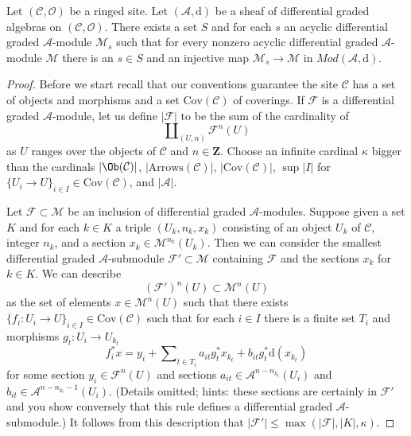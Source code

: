 \begin{lemma}
\label{lemma-small-acyclics}
Let $(\mathcal{C}, \mathcal{O})$ be a ringed site.
Let $(\mathcal{A}, \text{d})$ be a sheaf of differential graded algebras
on $(\mathcal{C}, \mathcal{O})$. There exists a set $S$ and for each $s$
an acyclic differential graded $\mathcal{A}$-module $\mathcal{M}_s$ such
that for every nonzero acyclic differential graded $\mathcal{A}$-module
$\mathcal{M}$ there is an $s \in S$ and an injective map
$\mathcal{M}_s \to \mathcal{M}$ in $\textit{Mod}(\mathcal{A}, \text{d})$.
\end{lemma}

\begin{proof}
Before we start recall that our conventions guarantee the site $\mathcal{C}$
has a set of objects and morphisms and a set $\text{Cov}(\mathcal{C})$
of coverings.
If $\mathcal{F}$
is a differential graded $\mathcal{A}$-module, let us define $|\mathcal{F}|$
to be the sum of the cardinality of
$$
\coprod\nolimits_{(U, n)} \mathcal{F}^n(U)
$$
as $U$ ranges over the objects of $\mathcal{C}$ and $n \in \mathbf{Z}$.
Choose an infinite cardinal $\kappa$ bigger than
the cardinals $|\Ob(\mathcal{C})|$, $|\text{Arrows}(\mathcal{C})|$,
$|\text{Cov}(\mathcal{C})|$, $\sup |I|$ for
$\{U_i \to U\}_{i \in I} \in \text{Cov}(\mathcal{C})$,
and $|\mathcal{A}|$.

\medskip\noindent
Let $\mathcal{F} \subset \mathcal{M}$ be an inclusion of
differential graded $\mathcal{A}$-modules.
Suppose given a set $K$ and for each $k \in K$ a triple
$(U_k, n_k, x_k)$ consisting of an object $U_k$ of $\mathcal{C}$,
integer $n_k$, and a section $x_k \in \mathcal{M}^{n_k}(U_k)$.
Then we can consider the smallest differential graded
$\mathcal{A}$-submodule $\mathcal{F}' \subset \mathcal{M}$
containing $\mathcal{F}$ and the sections $x_k$ for $k \in K$.
We can describe
$$
(\mathcal{F}')^n(U) \subset \mathcal{M}^n(U)
$$
as the set of elements $x \in \mathcal{M}^n(U)$ such that there
exists $\{f_i : U_i \to U\}_{i \in I} \in \text{Cov}(\mathcal{C})$ such that
for each $i \in I$ there is a finite set $T_i$ and morphisms
$g_t : U_i \to U_{k_t}$
$$
f_i^*x = y_i +
\sum\nolimits_{t \in T_i} a_{it}g_t^*x_{k_t} + b_{it}g_t^*\text{d}(x_{k_t})
$$
for some section $y_i \in \mathcal{F}^n(U)$ and
sections $a_{it} \in \mathcal{A}^{n - n_{k_t}}(U_i)$
and $b_{it} \in \mathcal{A}^{n - n_{k_t} - 1}(U_i)$.
(Details omitted; hints: these sections are certainly in $\mathcal{F}'$
and you show conversely that this rule defines a differential
graded $\mathcal{A}$-submodule.)
It follows from this description that
$|\mathcal{F}'| \leq \max(|\mathcal{F}|, |K|, \kappa)$.


\end{proof}
